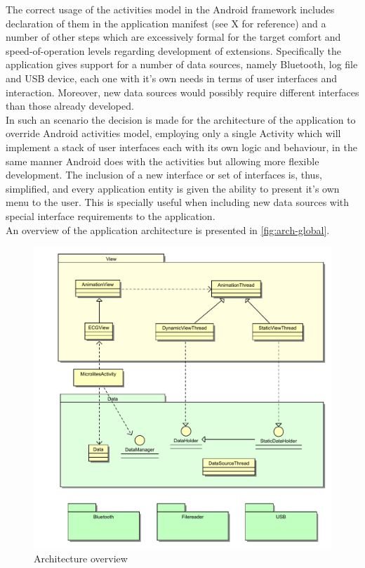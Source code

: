 		The correct usage of the activities model in the Android framework includes declaration of them in the application manifest (see X  for reference) and a number of other steps which are excessively formal for the target comfort and speed-of-operation levels regarding development of extensions. Specifically the application gives support for a number of data sources, namely Bluetooth, log file and USB device, each one with it's own needs in terms of user interfaces and interaction. Moreover, new data sources would possibly require different interfaces than those already developed.\\

		In such an scenario the decision is made for the architecture of the application to override Android activities model, employing only a single Activity which will implement a stack of user interfaces each with its own logic and behaviour, in the same manner Android does with the activities but allowing more flexible development. The inclusion of a new interface or set of interfaces is, thus, simplified, and every application entity is given the ability to present it's own menu to the user. This is specially useful when including new data sources with special interface requirements to the application.\\

		An overview of the application architecture is presented in \autoref{fig:arch-global}.

		\begin{figure}[h]
		\includegraphics[scale=0.5]{mlts-arch-main}
		\centering
		\caption{Architecture overview}
		\label{fig:arch-global}
		\end{figure}

